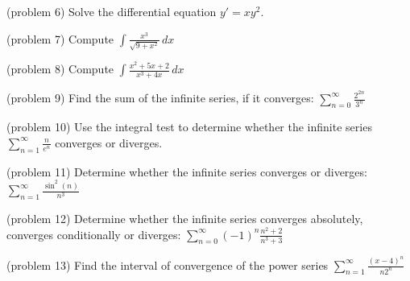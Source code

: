 \documentclass[handout]{ximera}
\begin{document}
\begin{problem}(problem 6)
Solve the differential equation $y' = xy^2$.

\end{problem}



\begin{problem}(problem 7)
Compute $\displaystyle \int \frac{x^3}{ \sqrt{9+x^2}} \, dx$

\end{problem}



\begin{problem}(problem 8)
Compute $\displaystyle \int \frac{x^2 + 5x + 2}{x^3 + 4x} \, dx$

\end{problem}






\begin{problem}(problem 9)
Find the sum of the infinite series, if it converges: $\displaystyle \sum_{n=0}^\infty \frac{2^{2n}}{3^n}$

\end{problem}


\begin{problem}(problem 10)
Use the integral test to determine whether the infinite series $\displaystyle \sum_{n=1}^\infty \frac{n}{e^n}$
converges or diverges.

\end{problem}


\begin{problem}(problem 11)
Determine whether the infinite series converges or diverges: $\displaystyle \sum_{n=1}^\infty \frac{\sin^2(n)}{n^3}$

\end{problem}


\begin{problem}(problem 12)
Determine whether the infinite series converges absolutely, converges conditionally or diverges: $\displaystyle \sum_{n=0}^\infty (-1)^n \frac{n^2 + 2}{n^3 + 3}$


\end{problem}


\begin{problem}(problem 13)
Find the interval of convergence of the power series $\displaystyle \sum_{n=1}^\infty \frac{(x-4)^n}{n2^n}$

\end{problem}
\end{document}
